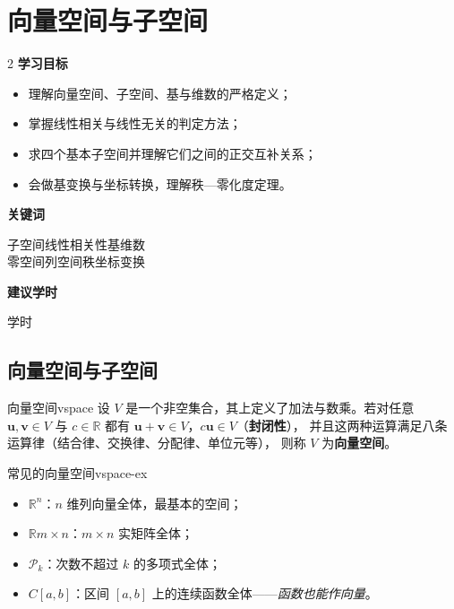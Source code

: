\documentclass[11pt,a4paper,openany]{ctexbook}
\newcommand{\R}{\mathbb{R}}
\newcommand{\Rnum}[1]{\mathbb{R}^{#1}}
\begin{document}
\chapter{向量空间与子空间}
\label{ch:space}

\begin{chapoutline}
\small
\begin{multicols}{2}
\textbf{学习目标}
\begin{itemize}[leftmargin=1.5em, itemsep=1.5pt]
\item 理解向量空间、子空间、基与维数的严格定义；
\item 掌握线性相关与线性无关的判定方法；
\item 求四个基本子空间并理解它们之间的正交互补关系；
\item 会做基变换与坐标转换，理解秩—零化度定理。
\end{itemize}
\columnbreak
\textbf{关键词}
\par\smallskip
子空间\quad 线性相关性\quad 基\quad 维数\\
零空间\quad 列空间\quad 秩\quad 坐标变换
\par\smallskip
\textbf{建议学时}
\par{} 学时
\end{multicols}
\end{chapoutline}

\section{向量空间与子空间}

\begin{defn}{向量空间}{vspace}
设 $V$ 是一个非空集合，其上定义了加法与数乘。若对任意
$\boldsymbol{u},\boldsymbol{v}\in V$ 与 $c\in\R$ 都有
$\boldsymbol{u}+\boldsymbol{v}\in V$，$c\boldsymbol{u}\in V$（\textbf{封闭性}），
并且这两种运算满足八条运算律（结合律、交换律、分配律、单位元等），
则称 $V$ 为\textbf{向量空间}。
\end{defn}

\begin{exmp}{常见的向量空间}{vspace-ex}
\begin{itemize}[itemsep=1pt]
\item $\Rnum{n}$：$n$ 维列向量全体，最基本的空间；
\item $\R{m\times n}$：$m\times n$ 实矩阵全体；
\item $\mathcal{P}_k$：次数不超过 $k$ 的多项式全体；
\item $C[a,b]$：区间 $[a,b]$ 上的连续函数全体——\emph{函数也能作向量}。
\end{itemize}
\end{exmp}
\end{document}
